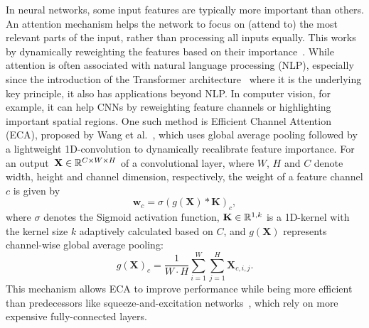 In neural networks, some input features are typically more important than others.
An attention mechanism helps the network to focus on (attend to) the most relevant parts of the input, rather than processing all inputs equally.
This works by dynamically reweighting the features based on their importance~\cite{Attention}.
While attention is often associated with natural language processing (NLP), especially since the introduction of the Transformer architecture~\cite{Transformer} where it is the underlying key principle, it also has applications beyond NLP.\@
In computer vision, for example, it can help CNNs by reweighting feature channels or highlighting important spatial regions.
One such method is Efficient Channel Attention (ECA), proposed by Wang et al.~\cite{ECA}, which uses global average pooling followed by a lightweight 1D-convolution to dynamically recalibrate feature importance.
For an output~$\mathbf{X} \in \mathbb{R}^{C \times W \times H}$ of a convolutional layer, where $W$, $H$ and $C$ denote width, height and channel dimension, respectively, the weight of a feature channel $c$ is given by
\begin{equation}
    \mathbf{w}_c = \sigma(g(\mathbf{X}) \ast \mathbf{K})_c,
\end{equation}
where $\sigma$ denotes the Sigmoid activation function, $\mathbf{K} \in \mathbb{R}^{1,k}$ is a 1D-kernel with the kernel size $k$ adaptively calculated based on $C$, and $g(\mathbf{X})$ represents channel-wise global average pooling:
\begin{equation}
    g(\mathbf{X})_c = \frac{1}{W \cdot H} \sum_{i=1}^{W} \sum_{j=1}^{H} \mathbf{X}_{c,i,j}.
\end{equation}
This mechanism allows ECA to improve performance while being more efficient than predecessors like squeeze-and-excitation networks~\cite{SqueezeExcite}, which rely on more expensive fully-connected layers.
